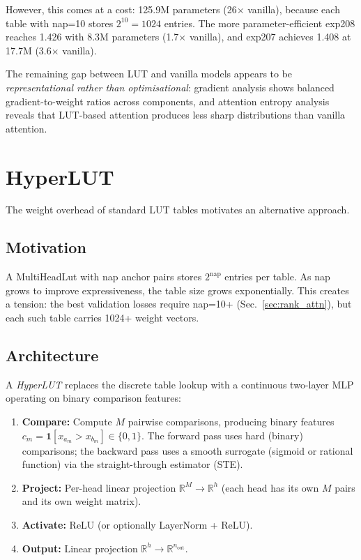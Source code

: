 \documentclass[11pt]{article}
\begin{document}
However, this comes at a cost: 125.9M parameters (26$\times$ vanilla), because each table with nap=10 stores $2^{10} = 1024$ entries.
The more parameter-efficient exp208 reaches 1.426 with 8.3M parameters (1.7$\times$ vanilla), and exp207 achieves 1.408 at 17.7M (3.6$\times$ vanilla).

The remaining gap between LUT and vanilla models appears to be \emph{representational rather than optimisational}: gradient analysis shows balanced gradient-to-weight ratios across components, and attention entropy analysis reveals that LUT-based attention produces less sharp distributions than vanilla attention.


\section{HyperLUT}
\label{sec:hyperlut}

The weight overhead of standard LUT tables motivates an alternative approach.

\subsection{Motivation}

A MultiHeadLut with nap anchor pairs stores $2^{\mathrm{nap}}$ entries per table.
As nap grows to improve expressiveness, the table size grows exponentially.
This creates a tension: the best validation losses require nap=10+ (Sec.~\ref{sec:rank_attn}), but each such table carries 1024+ weight vectors.

\subsection{Architecture}

A \emph{HyperLUT} replaces the discrete table lookup with a continuous two-layer MLP operating on binary comparison features:

\begin{enumerate}
    \item \textbf{Compare:} Compute $M$ pairwise comparisons, producing binary features $c_m = \mathbf{1}[x_{a_m} > x_{b_m}] \in \{0, 1\}$.
    The forward pass uses hard (binary) comparisons; the backward pass uses a smooth surrogate (sigmoid or rational function) via the straight-through estimator (STE).
    \item \textbf{Project:} Per-head linear projection $\mathbb{R}^M \to \mathbb{R}^{h}$ (each head has its own $M$ pairs and its own weight matrix).
    \item \textbf{Activate:} ReLU (or optionally LayerNorm + ReLU).
    \item \textbf{Output:} Linear projection $\mathbb{R}^{h} \to \mathbb{R}^{n_\mathrm{out}}$.
\end{enumerate}
\end{document}
